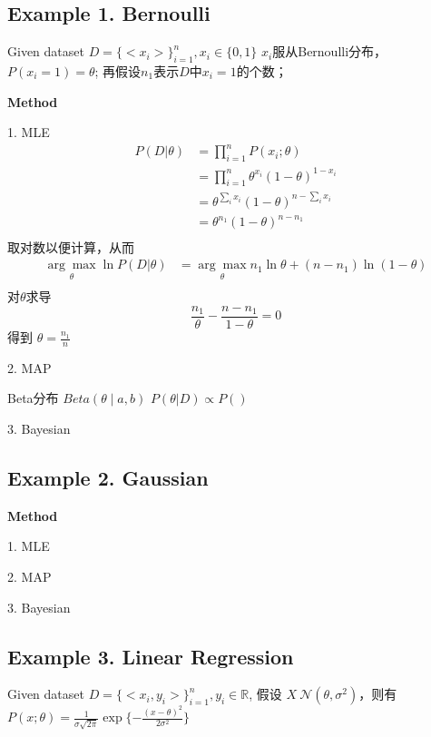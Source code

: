 \documentclass[UTF8]{ctexart}
\begin{document}
\subsection{Example 1. Bernoulli}
Given dataset $D=\{<x_i>\}_{i=1}^n, x_i \in \{0,1\}$
$x_i$服从Bernoulli分布，$P(x_i=1)=\theta$;
再假设$n_1$表示$D$中$x_i=1$的个数；

\textbf{Method}

1. MLE 
\begin{align*}
    P(D|\theta) &= \prod_{i=1}^n P(x_i; \theta) \\
    &= \prod_{i=1}^n \theta^{x_i} (1-\theta)^{1-x_i} \\
    &= \theta^{\sum_i x_i} (1-\theta)^{n-\sum_i x_i} \\
    &= \theta^{n_1} (1-\theta)^{n-n_1} \\
\end{align*}
取对数以便计算，从而
\begin{align*}
    \underset {\theta} {\arg \max} \ln P(D|\theta) &= \underset {\theta} {\arg \max} n_1 \ln \theta + (n-n_1) \ln (1-\theta) \\
\end{align*}
对$\theta$求导
\begin{equation*}
    \frac{n_1}{\theta} - \frac{n-n_1}{1-\theta} = 0
\end{equation*}
得到 $\theta = \frac{n_1}{n}$


2. MAP

Beta分布 $Beta(\theta \mid a, b)$
$P(\theta | D) \propto P()$ 

\begin{center} 
\end{center}

3. Bayesian


\subsection{Example 2. Gaussian}

\textbf{Method}

1. MLE 

2. MAP

3. Bayesian

\subsection{Example 3. Linear Regression}
Given dataset $D=\{<x_i, y_i>\}_{i=1}^n, y_i \in \mathbb{R}$,
假设 $X ~ \mathcal{N}(\theta, \sigma^2)$，则有
$P(x;\theta) = \frac{1}{\sigma \sqrt{2\pi}}\exp\{-\frac{(x-\theta)^2}{2\sigma^2}\}$
\end{document}

